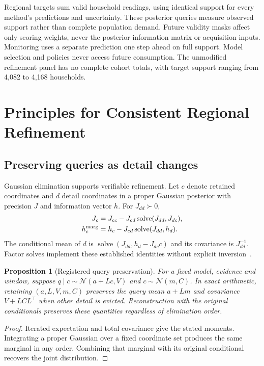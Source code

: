 \documentclass[conference]{IEEEtran}
\newtheorem{proposition}{Proposition}
\begin{document}
Regional targets sum valid household readings, using identical support for every method's predictions and uncertainty. These posterior queries measure observed support rather than complete population demand. Future validity masks affect only scoring weights, never the posterior information matrix or acquisition inputs. Monitoring uses a separate prediction one step ahead on full support. Model selection and policies never access future consumption. The unmodified refinement panel has no complete cohort totals, with target support ranging from 4,082 to 4,168 households.








\section{Principles for Consistent Regional Refinement}
\subsection{Preserving queries as detail changes}
Gaussian elimination supports verifiable refinement. Let $c$ denote retained coordinates and $d$ detail coordinates in a proper Gaussian posterior with precision $J$ and information vector $h$. For $J_{dd}\succ0$,
\begin{align}
J_c&=J_{cc}-J_{cd}\operatorname{solve}(J_{dd},J_{dc}),\label{eq:schur}\\
h_c^{\rm marg}&=h_c-J_{cd}\operatorname{solve}(J_{dd},h_d).
\end{align}
The conditional mean of $d$ is $\operatorname{solve}(J_{dd},h_d-J_{dc}c)$ and its covariance is $J_{dd}^{-1}$. Factor solves implement these established identities without explicit inversion~\cite{distributed,isam}.

\begin{proposition}[Registered query preservation]
For a fixed model, evidence and window, suppose
$q\mid c\sim\mathcal N(a+Lc,V)$ and $c\sim\mathcal N(m,C)$. In exact arithmetic, retaining $(a,L,V,m,C)$ preserves the query mean $a+Lm$ and covariance $V+LCL^\top$ when other detail is evicted. Reconstruction with the original conditionals preserves these quantities regardless of elimination order.
\end{proposition}
\begin{proof}
Iterated expectation and total covariance give the stated moments. Integrating a proper Gaussian over a fixed coordinate set produces the same marginal in any order. Combining that marginal with its original conditional recovers the joint distribution.
\end{proof}
\end{document}
